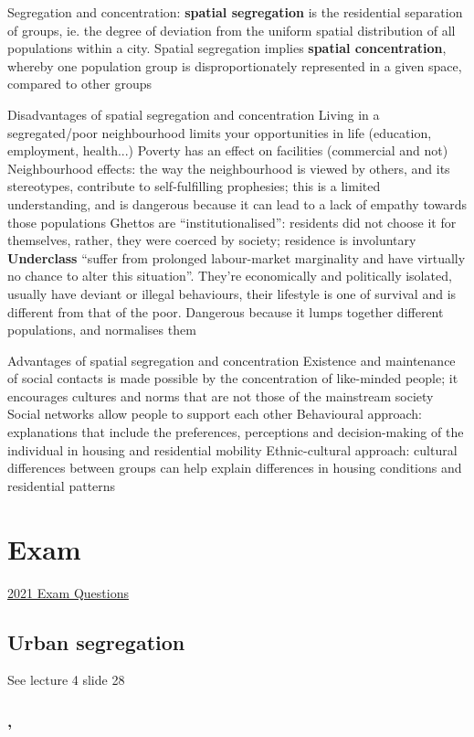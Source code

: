 \documentclass{article}
\begin{document}
\begin{outline}
	\1 Segregation and concentration: \textbf{spatial segregation} is the residential separation of groups, ie. the degree of deviation from the uniform spatial distribution of all populations within a city. Spatial segregation implies \textbf{spatial concentration}, whereby one population group is disproportionately represented in a given space, compared to other groups
		
	\1 Disadvantages of spatial segregation and concentration
		\2 Living in a segregated/poor neighbourhood limits your opportunities in life (education, employment, health...)
		\2 Poverty has an effect on facilities (commercial and not)
		\2 Neighbourhood effects: the way the neighbourhood is viewed by others, and its stereotypes, contribute to self-fulfilling prophesies; this is a limited understanding, and is dangerous because it can lead to a lack of empathy towards those populations
		\2 Ghettos are ``institutionalised'': residents did not choose it for themselves, rather, they were coerced by society; residence is involuntary
		\2 \textbf{Underclass} ``suffer from prolonged labour-market marginality and have virtually no chance to alter this situation''. They're economically and politically isolated, usually have deviant or illegal behaviours, their lifestyle is one of survival and is different from that of the poor. Dangerous because it lumps together different populations, and normalises them
		
	\1 Advantages of spatial segregation and concentration
		\2 Existence and maintenance of social contacts is made possible by the concentration of like-minded people; it encourages cultures and norms that are not those of the mainstream society
		\2 Social networks allow people to support each other
	\1 Behavioural approach: explanations that include the preferences, perceptions and decision-making of the individual in housing and residential mobility
	\1 Ethnic-cultural approach: cultural differences between groups can help explain differences in housing conditions and residential patterns

\end{outline}


\section{Exam}

\href{https://bakexamenwiki.wordpress.com/urban-geography/?fbclid=IwAR1qxA_V_G9I3NVC_17dFMUmEMLisoLB-XfgdqZmQNxIsUydvhO_ZnCOFVU}{2021 Exam Questions}

\subsection{Urban segregation}

See lecture 4 slide 28


\begin{outline}
	\1
\end{outline}

\subsubsection{, \textit{}}

\fi
\end{document}
